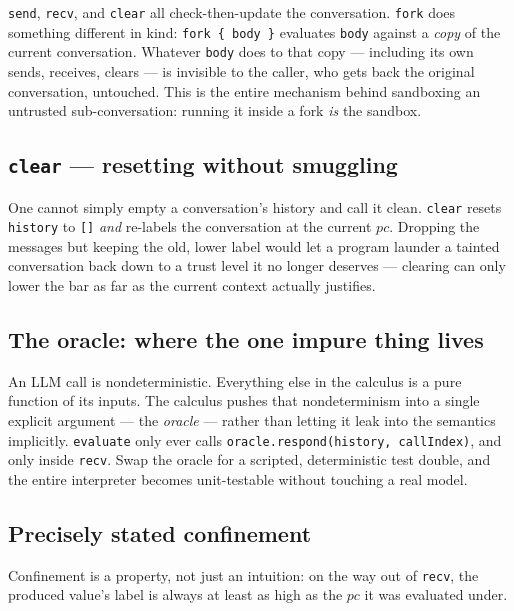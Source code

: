 \documentclass[11pt, a4paper]{article}
\begin{document}
\lstinline{send}, \lstinline{recv}, and \lstinline{clear} all check-then-update the
conversation. \lstinline{fork} does something different in kind:
\lstinline|fork { body }| evaluates \lstinline{body} against a \emph{copy}
of the current conversation. Whatever \lstinline{body} does to that copy
--- including its own sends, receives, clears --- is invisible to the
caller, who gets back the original conversation, untouched. This is the
entire mechanism behind sandboxing an untrusted sub-conversation: running
it inside a fork \emph{is} the sandbox.

\subsection{\texttt{clear} --- resetting without smuggling}

One cannot simply empty a conversation's history and call it clean.
\lstinline{clear} resets \lstinline{history} to \lstinline{[]} \emph{and}
re-labels the conversation at the current $pc$. Dropping the messages but
keeping the old, lower label would let a program launder a tainted
conversation back down to a trust level it no longer deserves --- clearing
can only lower the bar as far as the current context actually justifies.

\subsection{The oracle: where the one impure thing lives}

An LLM call is nondeterministic. Everything else in the calculus is a
pure function of its inputs. The calculus pushes that nondeterminism into
a single explicit argument --- the \emph{oracle} --- rather than letting
it leak into the semantics implicitly. \lstinline{evaluate} only ever
calls \lstinline{oracle.respond(history, callIndex)}, and only inside
\lstinline{recv}. Swap the oracle for a scripted, deterministic test
double, and the entire interpreter becomes unit-testable without touching
a real model.

\subsection{Precisely stated confinement}

Confinement is a property, not just an intuition: on the way out of
\lstinline{recv}, the produced value's label is always at least as high as the
$pc$ it was evaluated under.
\end{document}
